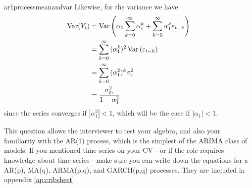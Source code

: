 \begin{answer}{ar1processmeanandvar}
Likewise, for the variance we have
\begin{align*}
\operatorname{\mathrm{Var}}(Y_t)
&=
\operatorname{\mathrm{Var}}\left(
  \alpha_0
  \sum_{k=0}^{\infty}
  {\alpha_1^k}
  +
  \sum_{k=0}^{\infty}{
    \alpha_1^k
    \varepsilon_{t-k}
    }
    \right) \\
&=
  \sum_{k=0}^{\infty}{
    (\alpha_1^k)^2
\operatorname{\mathrm{Var}}\left(
    \varepsilon_{t-k}
    \right)
    } \\
&=
  \sum_{k=0}^{\infty}{
    (\alpha_1^2)^k
    \sigma^2_{\varepsilon}
    } \\
&= \frac{ \sigma^2_{\varepsilon_{t}}}{1- \alpha_1^2}
\end{align*}
since the series converges if
$|\alpha_1^2| < 1$,
which will be the case if
$|\alpha_1| < 1$.

This question allows the interviewer to test your algebra, and also your familiarity with the AR(1) process, which is the simplest of the ARIMA class of models.
If you mentioned time series on your CV---or if the role requires knowledge about time series---make
sure you can write down the equations for a AR(p),  MA(q), ARMA(p,q), and GARCH(p,q) processes.
They are included in appendix \ref{ap:cribsheet}.
\end{answer}
